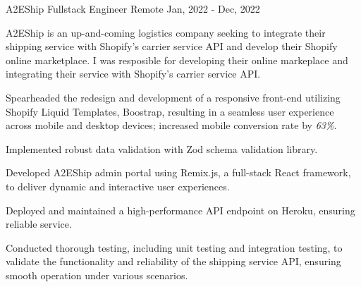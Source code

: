 \cventry
{A2EShip} %
{Fullstack Engineer} %
{Remote}
{Jan, 2022 - Dec, 2022}
{
	A2EShip is an up-and-coming logistics company seeking to integrate their shipping service with Shopify's carrier service API and develop their Shopify online marketplace. I was resposible for developing their online markeplace and integrating their service with Shopify's carrier service API.
	\begin{cvitemsdesc} %
		\item {Spearheaded the redesign and development of a responsive front-end utilizing Shopify Liquid Templates, Boostrap, resulting in a seamless user experience across mobile and desktop devices; increased mobile conversion rate by \emph{63\%}.}
		\item {Implemented robust data validation with Zod schema validation library.}
		\item {Developed A2EShip admin portal using Remix.js, a full-stack React framework, to deliver dynamic and interactive user experiences.}
		\item {Deployed and maintained a high-performance API endpoint on Heroku, ensuring reliable service.}
		\item {Conducted thorough testing, including unit testing and integration testing, to validate the functionality and reliability of the shipping service API, ensuring smooth operation under various scenarios.}
	\end{cvitemsdesc}
}
